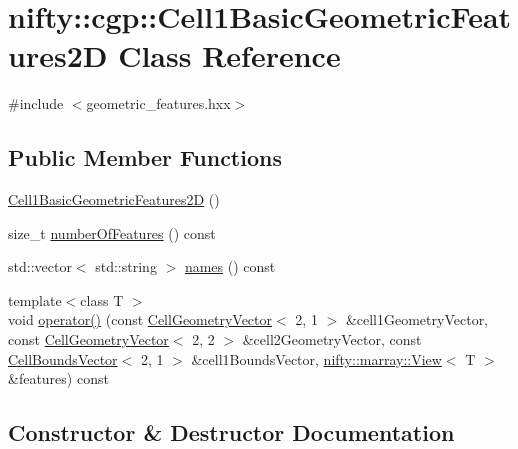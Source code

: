 \hypertarget{classnifty_1_1cgp_1_1Cell1BasicGeometricFeatures2D}{}\section{nifty\+:\+:cgp\+:\+:Cell1\+Basic\+Geometric\+Features2D Class Reference}
\label{classnifty_1_1cgp_1_1Cell1BasicGeometricFeatures2D}


{\ttfamily \#include $<$geometric\+\_\+features.\+hxx$>$}

\subsection*{Public Member Functions}
\begin{DoxyCompactItemize}
\item 
\hyperlink{classnifty_1_1cgp_1_1Cell1BasicGeometricFeatures2D_a21c1cd8100f7a511f5b500fd51527795}{Cell1\+Basic\+Geometric\+Features2D} ()
\item 
size\+\_\+t \hyperlink{classnifty_1_1cgp_1_1Cell1BasicGeometricFeatures2D_a53caf9d94820a490f1c03030d2221884}{number\+Of\+Features} () const
\item 
std\+::vector$<$ std\+::string $>$ \hyperlink{classnifty_1_1cgp_1_1Cell1BasicGeometricFeatures2D_a9878ed2a249352e4c3e5cd8f4c0f679d}{names} () const
\item 
{\footnotesize template$<$class T $>$ }\\void \hyperlink{classnifty_1_1cgp_1_1Cell1BasicGeometricFeatures2D_ab055a6b5bf3720dfc2e1a69cc8b1ddc8}{operator()} (const \hyperlink{classnifty_1_1cgp_1_1CellGeometryVector}{Cell\+Geometry\+Vector}$<$ 2, 1 $>$ \&cell1\+Geometry\+Vector, const \hyperlink{classnifty_1_1cgp_1_1CellGeometryVector}{Cell\+Geometry\+Vector}$<$ 2, 2 $>$ \&cell2\+Geometry\+Vector, const \hyperlink{classnifty_1_1cgp_1_1CellBoundsVector}{Cell\+Bounds\+Vector}$<$ 2, 1 $>$ \&cell1\+Bounds\+Vector, \hyperlink{classandres_1_1View}{nifty\+::marray\+::\+View}$<$ T $>$ \&features) const
\end{DoxyCompactItemize}


\subsection{Constructor \& Destructor Documentation}
\mbox{\label{classnifty_1_1cgp_1_1Cell1BasicGeometricFeatures2D_a21c1cd8100f7a511f5b500fd51527795}} 
